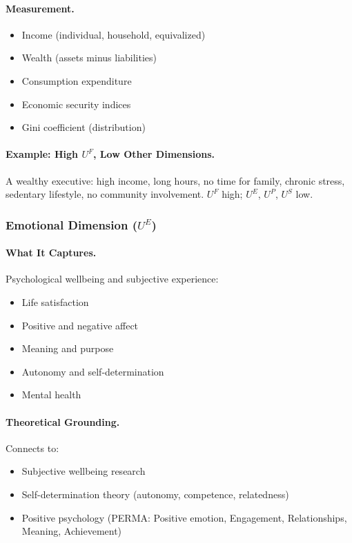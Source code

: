 \documentclass[12pt,a4paper]{article}
\begin{document}
\paragraph{Measurement.}
\begin{itemize}
  \item Income (individual, household, equivalized)
  \item Wealth (assets minus liabilities)
  \item Consumption expenditure
  \item Economic security indices
  \item Gini coefficient (distribution)
\end{itemize}

\paragraph{Example: High $U^F$, Low Other Dimensions.}
A wealthy executive: high income, long hours, no time for family,
chronic stress, sedentary lifestyle, no community involvement.
$U^F$ high; $U^E$, $U^P$, $U^S$ low.

\subsubsection{Emotional Dimension ($U^E$)}

\paragraph{What It Captures.}
Psychological wellbeing and subjective experience:
\begin{itemize}
  \item Life satisfaction
  \item Positive and negative affect
  \item Meaning and purpose
  \item Autonomy and self-determination
  \item Mental health
\end{itemize}

\paragraph{Theoretical Grounding.}
Connects to:
\begin{itemize}
  \item Subjective wellbeing research \citep{diener1999}
  \item Self-determination theory (autonomy, competence, relatedness)
  \item Positive psychology (PERMA: Positive emotion, Engagement, Relationships, Meaning, Achievement)
\end{itemize}
\end{document}
